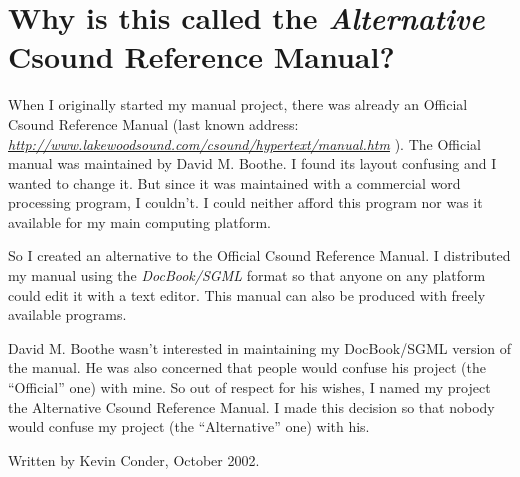 \begin{comment}
\documentclass[10pt]{article}
\usepackage{fullpage, graphicx, url}
\setlength{\parskip}{1ex}
\setlength{\parindent}{0ex}
\title{Why is this called the Alternative Csound Reference Manual?}



\begin{tabular}{ccc}
The Alternative Csound Reference Manual & & \\
Previous &Preface &Next

\end{tabular}

\end{comment}
\section{Why is this called the \emph{Alternative}
 Csound Reference Manual?}


  When I originally started my manual project, there was already an Official Csound Reference Manual (last known address: \emph{\url{http://www.lakewoodsound.com/csound/hypertext/manual.htm}}
). The Official manual was maintained by David M. Boothe. I found its layout confusing and I wanted to change it. But since it was maintained with a commercial word processing program, I couldn't. I could neither afford this program nor was it available for my main computing platform. 


  So I created an alternative to the Official Csound Reference Manual. I distributed my manual using the \emph{DocBook/SGML}
 format so that anyone on any platform could edit it with a text editor. This manual can also be produced with freely available programs. 


  David M. Boothe wasn't interested in maintaining my DocBook/SGML version of the manual. He was also concerned that people would confuse his project (the ``Official'' one) with mine. So out of respect for his wishes, I named my project the Alternative Csound Reference Manual. I made this decision so that nobody would confuse my project (the ``Alternative'' one) with his. 


  Written by Kevin Conder, October 2002. 


\begin{comment}
\begin{tabular}{lcr}
Previous &Home &Next \\
Acknowledgements &Up &What is the scope of the Alternative Csound Reference Manual?

\end{tabular}



\end{comment}
